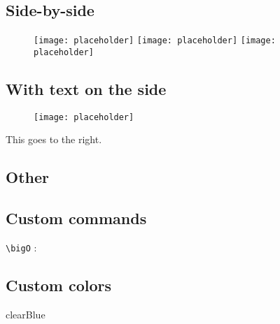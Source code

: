 \documentclass{customSynthesis}
\begin{document}
\subsection*{Side-by-side}

\begin{figure}[H]
    \centering
    \texttt{[image: placeholder]}\hfill
	\texttt{[image: placeholder]}\hfill
	\texttt{[image: placeholder]}
\end{figure}

\subsection*{With text on the side}

\begin{minipage}{0.5\textwidth}
	\begin{figure}[H]
		\centering
		\texttt{[image: placeholder]}
	\end{figure}
\end{minipage}
\begin{minipage}{0.5\textwidth}
	This goes to the right.
\end{minipage}

\subsection*{Other}

\subsection*{Custom commands}

\verb|\bigO| : \bigO

\subsection*{Custom colors}

\textcolor{clearBlue}{clearBlue}
\end{document}
